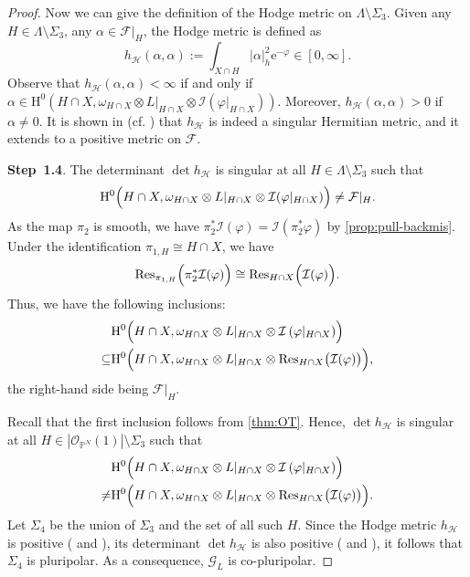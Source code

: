 \begin{proof}
Now we can give the definition of the Hodge metric on $\Lambda\setminus \Sigma_3$.
Given any $H\in \Lambda\setminus \Sigma_3$, any $\alpha\in \mathcal{F}|_H$, the Hodge metric is defined as
\[
h_{\mathcal{H}}(\alpha,\alpha):=\int_{X\cap H} |\alpha|^2_{h}\mathrm{e}^{-\varphi}\in [0,\infty].
\]
Observe that $h_{\mathcal{H}}(\alpha,\alpha)<\infty$ if and only if $\alpha\in \mathrm{H}^0(H\cap X,\omega_{H\cap X}\otimes L|_{H\cap X}\otimes \mathcal{I}(\varphi|_{H\cap X}))$. Moreover, $h_{\mathcal{H}}(\alpha,\alpha)>0$ if $\alpha\neq 0$.
It is shown in \cite{HPS18} (cf. \cite[Theorem~3.3.5]{PT18}) that $h_{\mathcal{H}}$ is indeed a singular Hermitian metric, and it extends to a positive metric on $\mathcal{F}$.

\textbf{Step~1.4}.
The determinant $\det h_{\mathcal{H}}$ is singular at all $H\in \Lambda\setminus \Sigma_3$ such that
\[
\mathrm{H}^0\Bigl(H\cap X,\omega_{H\cap X}\otimes L|_{H\cap X}\otimes \mathcal{I}(\varphi|_{H\cap X})\Bigr)\neq \mathcal{F}|_H.
\]
As the map $\pi_2$ is smooth, we have $\pi_2^*\mathcal{I}(\varphi)= \mathcal{I}(\pi_2^*\varphi)$ by \cref{prop:pull-backmis}.
Under the identification $\pi_{1,H}\cong H\cap X$, we have
\[
\operatorname{Res}_{\pi_{1,H}}\Bigl(\pi_2^*\mathcal{I}(\varphi)\Bigr)\cong \operatorname{Res}_{H\cap X}\Bigl(\mathcal{I}(\varphi)\Bigr).
\]
Thus, we have the following inclusions:
\[
\begin{split}
&\mathrm{H}^0\Bigl(H\cap X,\omega_{H\cap X}\otimes L|_{H\cap X}\otimes \mathcal{I}\left(\varphi|_{H\cap X}\right)\Bigr)\\
\subseteq & \mathrm{H}^0\Bigl(H\cap X,\omega_{H\cap X}\otimes L|_{H\cap X}\otimes \operatorname{Res}_{H\cap X}\bigl(\mathcal{I}(\varphi)\bigr)\Bigr),
\end{split}
\]
the right-hand side being $\mathcal{F}|_H$.

Recall that the first inclusion follows from \cref{thm:OT}.
Hence, $\det h_{\mathcal{H}}$ is singular at all $H\in |\mathcal{O}_{\mathbb{P}^N}(1)|\setminus \Sigma_3$ such that
\[
\begin{split}
&\mathrm{H}^0\Bigl(H\cap X,\omega_{H\cap X}\otimes L|_{H\cap X}\otimes \mathcal{I}\left(\varphi|_{H\cap X}\right)\Bigr)\\
\neq & \mathrm{H}^0\Bigl(H\cap X,\omega_{H\cap X}\otimes L|_{H\cap X}\otimes \operatorname{Res}_{H\cap X}\bigl(\mathcal{I}(\varphi)\bigr)\Bigr).
\end{split}
\]
Let $\Sigma_4$ be the union of $\Sigma_3$ and the set of all such $H$.
Since the Hodge metric $h_{\mathcal{H}}$ is positive (\cite[Theorem~3.3.5]{PT18} and \cite[Theorem~21.1]{HPS18}),
its determinant $\det h_{\mathcal{H}}$ is also positive (\cite[Proposition~1.3]{Rau15} and \cite[Proposition~25.1]{HPS18}), it follows that $\Sigma_4$ is pluripolar. As a consequence, $\mathcal{G}_{L}$ is co-pluripolar.


\end{proof}
